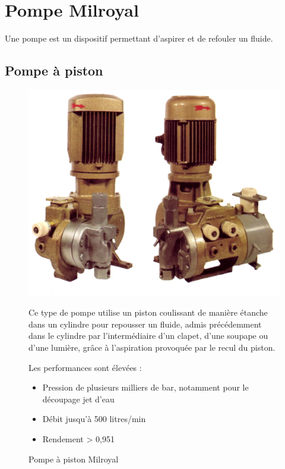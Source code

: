 

\section{Pompe Milroyal}

Une pompe est un dispositif permettant d'aspirer et de refouler un fluide. 
\subsection{Pompe à piston}

\begin{figure}[htbp]
\begin{minipage}[c]{.4\linewidth}
\begin{center}
\includegraphics[width=\linewidth]{img/pompe_piston}
\caption{Pompe à piston Milroyal}
\label{fig:image1}
\end{center}
\end{minipage}
\hfill
\begin{minipage}[c]{.55\linewidth}
 
 Ce type de pompe utilise un piston coulissant de manière étanche dans un cylindre pour repousser un fluide, admis précédemment dans le cylindre par l'intermédiaire d'un clapet, d'une soupape ou d'une lumière, grâce à l'aspiration provoquée par le recul du piston.

Les performances sont élevées :

\begin{itemize}
 \item Pression de plusieurs milliers de bar, notamment pour le découpage jet d'eau
 \item Débit jusqu'à 500 litres/min
 \item Rendement > 0,951
\end{itemize}

\end{minipage}
\end{figure}


